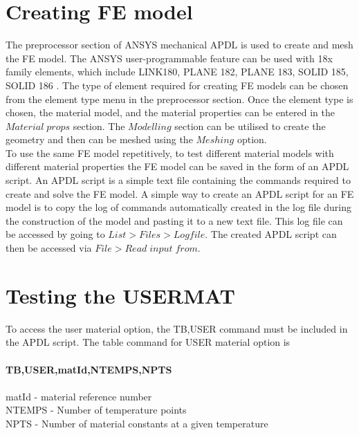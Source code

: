 \documentclass[12pt,openright,twoside]{report}
\begin{document}
\section{Creating FE model}
\indent\indent\indent  The preprocessor section of ANSYS mechanical APDL is used to create and mesh the FE model. The ANSYS user-programmable feature can be used with 18x family elements, which include LINK180, PLANE 182, PLANE 183, SOLID 185, SOLID 186 \citep{lin1999ansys}. The type of element required for creating FE models can be chosen from the element type menu in the preprocessor section. Once the element type is chosen, the material model, and the material properties can be entered in the $Material\; props$ section.  The $Modelling$ section can be utilised to create the geometry and then can be meshed using the $Meshing$ option.\\ \indent\indent\indent To use the same FE model repetitively, to test different material models with different material properties the FE model can be saved in the form of an APDL script.  An APDL script is a simple text file containing the commands required to create and solve the FE model. A simple way to create an APDL script for an FE model is to copy the log of commands automatically created in the log file during the construction of the model and pasting it to a new text file. This log file can be accessed by going to $List>Files>Logfile$. The created APDL script can then be accessed via $File>Read \;input\; from$.

\section{Testing the USERMAT}
\indent\indent\indent  To access the user material option, the TB,USER command must be included in the APDL script. The table command for USER material option is\\
\\
\textbf{TB,USER,matId,NTEMPS,NPTS \citep{lin1999ansys}}
\\
\\
\indent matId - material reference number
\\
\indent NTEMPS - Number of temperature points 
\\
\indent NPTS  -  Number of material constants at a given temperature
\\
\end{document}
